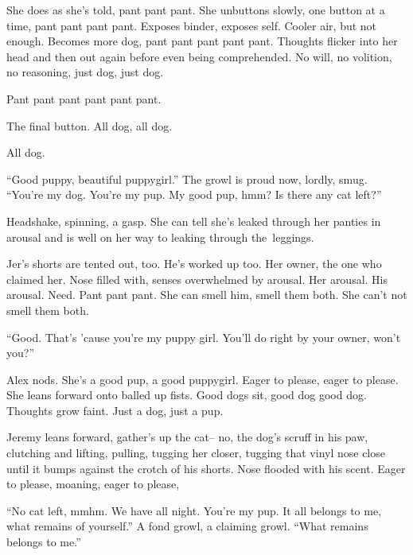 She does as she's told, pant pant pant. She unbuttons slowly, one button at a time, pant pant pant pant. Exposes binder, exposes self. Cooler air, but not enough. Becomes more dog, pant pant pant pant pant. Thoughts flicker into her head and then out again before even being comprehended. No will, no volition, no reasoning, just dog, just dog.

Pant pant pant pant pant pant.

The final button. All dog, all dog.

All dog.

``Good puppy, beautiful puppygirl.'' The growl is proud now, lordly, smug. ``You're my dog. You're my pup. My good pup, hmm? Is there any cat left?''

Headshake, spinning, a gasp. She can tell she's leaked through her panties in arousal and is well on her way to leaking through the~leggings.

Jer's shorts are tented out, too. He's worked up too. Her owner, the one who claimed her. Nose filled with, senses overwhelmed by arousal. Her arousal. His arousal. Need. Pant pant pant. She can smell him, smell them both. She can't not smell them both.

``Good. That's 'cause you're my puppy girl. You'll do right by your owner, won't you?''

Alex nods. She's a good pup, a good puppygirl. Eager to please, eager to please. She leans forward onto balled up fists. Good dogs sit, good dog good dog. Thoughts grow faint. Just a dog, just a pup.

Jeremy leans forward, gather's up the cat-- no, the dog's scruff in his paw, clutching and lifting, pulling, tugging her closer, tugging that vinyl nose close until it bumps against the crotch of his shorts. Nose flooded with his scent. Eager to please, moaning, eager to please,

``No cat left, mmhm. We have all night. You're my pup. It all belongs to me, what remains of yourself.'' A fond growl, a claiming growl. ``What remains belongs to me.''
